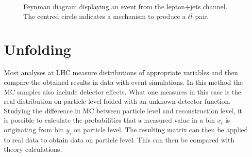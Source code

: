 	\begin{figure}
		\centering
		\caption{Feynman diagram \cite{feynman} displaying an event from the lepton+jets channel. The centred circle indicates a mechanism to produce a $t\bar{t}$ pair.}
		\label{fig:semilep}
	\end{figure}
	

\section{Unfolding}
	Most analyses at LHC measure distributions of appropriate variables and then compare the obtained results in data with event simulations. In this method the MC samples also include detector effects. What one measures in this case is the real distribution on particle level folded with an unknown detector function. Studying the difference in MC between particle level and reconstruction level, it is possible to calculate the probabilities that a measured value in a bin $x_i$ is originating from bin $y_i$ on particle level. The resulting matrix can then be applied to real data to obtain data on particle level. This can then be compared with theory calculations.
	